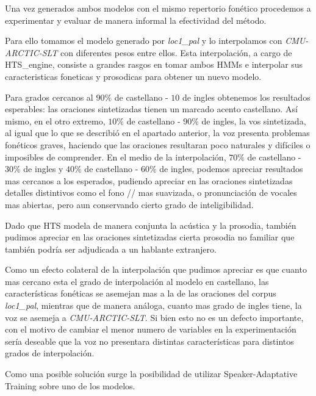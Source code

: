 Una vez generados ambos modelos con el mismo repertorio fonético procedemos a experimentar y evaluar de manera informal la efectividad del método.

Para ello tomamos el modelo generado por \textit{loc1\_pal} y lo interpolamos con \textit{CMU-ARCTIC-SLT} con diferentes pesos entre ellos. Esta interpolación, a cargo de HTS\_engine, consiste a grandes rasgos en tomar ambos HMMs e interpolar sus caracteristicas foneticas y prosodicas para obtener un nuevo modelo.

Para grados cercanos al $90\%$ de castellano - $10$ de ingles obtenemos los resultados esperables: las oraciones sintetizadas tienen un marcado acento castellano. Así mismo, en el otro extremo, $10\%$ de castellano - $90\%$ de ingles, la vos sintetizada, al igual que lo que se describió en el apartado anterior, la voz presenta problemas fonéticos graves, haciendo que las oraciones resultaran poco naturales y difíciles o imposibles de comprender. En el medio de la interpolación, $70\%$ de castellano - $30\%$ de ingles y $40\%$ de castellano - $60\%$ de ingles, podemos apreciar resultados mas cercanos a los esperados, pudiendo apreciar en las oraciones sintetizadas detalles distintivos como el fono // mas suavizada, o pronunciación de vocales mas abiertas, pero aun conservando cierto grado de inteligibilidad.

Dado que HTS modela de manera conjunta la acústica y la prosodia, también pudimos apreciar en las oraciones sintetizadas cierta prosodia no familiar que también podría ser adjudicada a un hablante extranjero.  

Como un efecto colateral de la interpolación que pudimos apreciar es que cuanto mas cercano esta el grado de interpolación al modelo en castellano, las características fonéticas se asemejan mas a la de las oraciones del corpus \textit{loc1\_pal}, mientras que de manera análoga, cuanto mas grado de ingles tiene, la voz se asemeja a \textit{CMU-ARCTIC-SLT}. Si bien esto no es un defecto importante, con el motivo de cambiar el menor numero de variables en la experimentación sería deseable que la voz no presentara distintas características para distintos grados de interpolación.

Como una posible solución surge la posibilidad de utilizar Speaker-Adaptative Training sobre uno de los modelos.